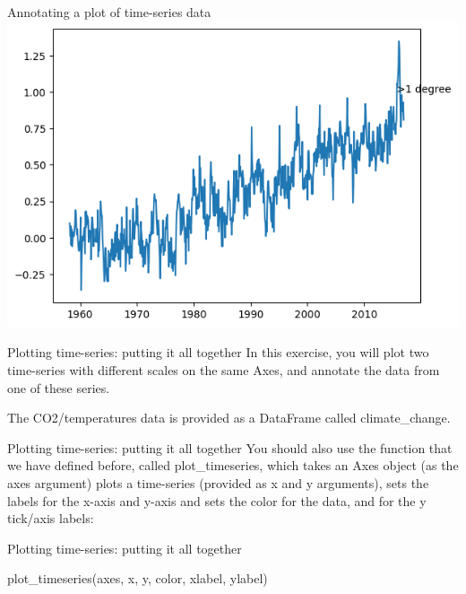 \documentclass[
  ignorenonframetext,
]{beamer}
\newenvironment{Shaded}{\begin{snugshade}}{\end{snugshade}}
\newcommand{\NormalTok}[1]{#1}
\begin{document}
\begin{frame}{Annotating a plot of time-series data}
\label{annotating-a-plot-of-time-series-data-3}
\includegraphics{../images/im237.png}
\end{frame}

\begin{frame}{Plotting time-series: putting it all together}
\label{plotting-time-series-putting-it-all-together}
In this exercise, you will plot two time-series with different scales on
the same Axes, and annotate the data from one of these series.

The CO2/temperatures data is provided as a DataFrame called
climate\_change.
\end{frame}

\begin{frame}{Plotting time-series: putting it all together}
\label{plotting-time-series-putting-it-all-together-1}
You should also use the function that we have defined before, called
plot\_timeseries, which takes an Axes object (as the axes argument)
plots a time-series (provided as x and y arguments), sets the labels for
the x-axis and y-axis and sets the color for the data, and for the y
tick/axis labels:
\end{frame}

\begin{frame}[fragile]{Plotting time-series: putting it all together}
\label{plotting-time-series-putting-it-all-together-2}

\begin{Shaded}
\begin{Highlighting}[]
\NormalTok{plot\_timeseries(axes, x, y, color, xlabel, ylabel)}
\end{Highlighting}
\end{Shaded}
\end{frame}
\end{document}
